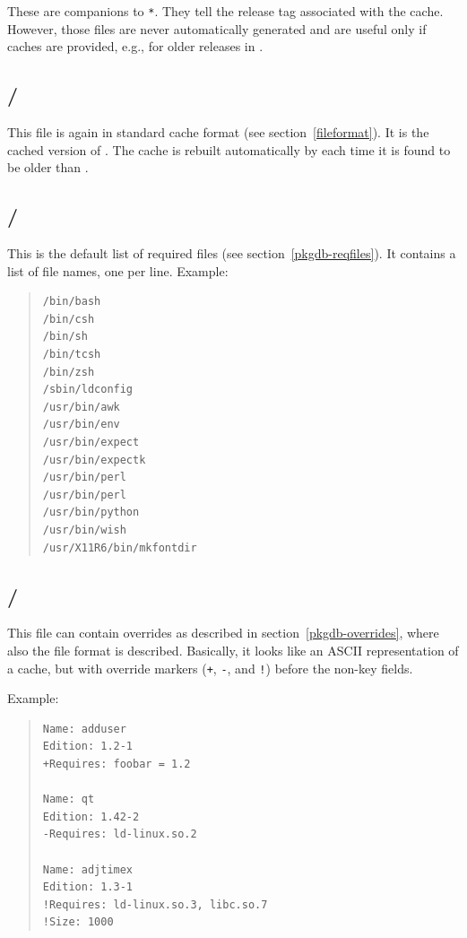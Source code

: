 \documentclass[10pt]{article}
\begin{document}
These are companions to \RCACHEPREFIX\texttt{*}. They tell the release
tag associated with the cache. However, those files are never
automatically generated and are useful only if caches are provided,
e.g., for older releases in \PKGDBVLIBPATH.

\subsection{\PKGDBVLIBPATH\slash\ICACHEFILENAME}

This file is again in standard cache format (see
section~\ref{fileformat}). It is the cached version of \RPMDBFILENAME.
The cache is rebuilt automatically by  each time it is
found to be older than \RPMDBFILENAME.

\subsection{\PKGDBULIBPATH\slash\REQFILESFILENAME}

This is the default list of required files (see
section~\ref{pkgdb-reqfiles}). It contains a list of file names, one
per line. Example:
\begin{quote}
\begin{verbatim}
/bin/bash
/bin/csh
/bin/sh
/bin/tcsh
/bin/zsh
/sbin/ldconfig
/usr/bin/awk
/usr/bin/env
/usr/bin/expect
/usr/bin/expectk
/usr/bin/perl
/usr/bin/perl
/usr/bin/python
/usr/bin/wish
/usr/X11R6/bin/mkfontdir
\end{verbatim}
\end{quote}

\subsection{\PKGDBULIBPATH\slash\OVERRIDESFILENAME}

This file can contain overrides as described in
section~\ref{pkgdb-overrides}, where also the file format is
described. Basically, it looks like an ASCII representation of a
cache, but with override markers (\texttt{+}, \texttt{-}, and
\texttt{!}) before the non-key fields.

Example:
\begin{quote}
\begin{verbatim}
Name: adduser
Edition: 1.2-1
+Requires: foobar = 1.2

Name: qt
Edition: 1.42-2
-Requires: ld-linux.so.2

Name: adjtimex
Edition: 1.3-1
!Requires: ld-linux.so.3, libc.so.7
!Size: 1000
\end{verbatim}
\end{quote}
\end{document}
